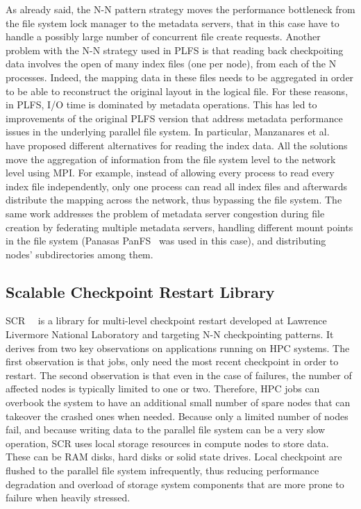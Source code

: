 As already said, the N-N pattern strategy moves the performance bottleneck from the file system lock manager to the metadata servers, that in this case have to handle a possibly large number of concurrent file
create requests. Another problem with the N-N strategy used in PLFS is that reading back checkpoiting data involves the open of many index files (one per node), from each of the N processes. Indeed, the mapping 
data in these files needs to be aggregated in order to be able to reconstruct the original layout in the logical file. For these reasons, in PLFS, I/O time is dominated by metadata operations. This has led 
to improvements of the original PLFS version that address metadata performance issues in the underlying parallel file system. In particular, Manzanares et al.~\cite{Adam2011} have proposed different alternatives 
for reading the index data. All the solutions move the aggregation of information from the file system level to the network level using MPI. For example, instead of allowing every process to read every index file
independently, only one process can read all index files and afterwards distribute the mapping across the network, thus bypassing the file system. The same work addresses the problem of metadata server congestion 
during file creation by federating multiple metadata servers, handling different mount points in the file system (Panasas PanFS~\cite{Welch2004} was used in this case), and distributing nodes' subdirectories among 
them.

\subsection{Scalable Checkpoint Restart Library}
SCR~\cite{Moody2010_2}~\cite{Moody2010} is a library for multi-level checkpoint restart developed at Lawrence Livermore National Laboratory and targeting N-N checkpointing patterns. It derives from two key 
observations on applications running on HPC systems. The first observation is that jobs, only need the most recent checkpoint in order to restart. The second observation is that even in the case of failures, 
the number of affected nodes is typically limited to one or two. Therefore, HPC jobs can overbook the system to have an additional small number of spare nodes that can takeover the crashed ones when needed.
Because only a limited number of nodes fail, and because writing data to the parallel file system can be a very slow operation, SCR uses local storage resources in compute nodes to store data. These can be RAM 
disks, hard disks or solid state drives. Local checkpoint are flushed to the parallel file system infrequently, thus reducing performance degradation and overload of storage system components that are more 
prone to failure when heavily stressed.

